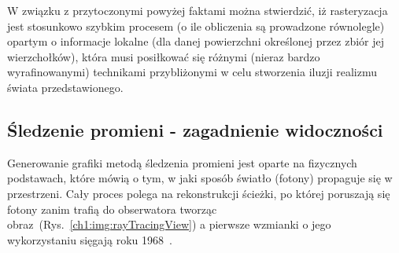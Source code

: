 W związku z przytoczonymi powyżej faktami można stwierdzić, iż rasteryzacja jest stosunkowo szybkim procesem (o ile obliczenia są prowadzone równolegle) opartym o informacje lokalne (dla danej powierzchni określonej przez zbiór jej wierzchołków), która musi posiłkować się różnymi (nieraz bardzo wyrafinowanymi) technikami przybliżonymi w celu stworzenia iluzji realizmu świata przedstawionego.

\subsection{Śledzenie promieni - zagadnienie widoczności}
Generowanie grafiki metodą śledzenia promieni jest oparte na fizycznych podstawach, które mówią o tym, w jaki sposób światło (fotony) propaguje się w przestrzeni. Cały proces polega na rekonstrukcji ścieżki, po której poruszają się fotony zanim trafią do obserwatora tworząc obraz~(Rys.~\ref{ch1:img:rayTracingView}) a pierwsze wzmianki o jego wykorzystaniu sięgają roku 1968~\cite{APPEL1968}.


